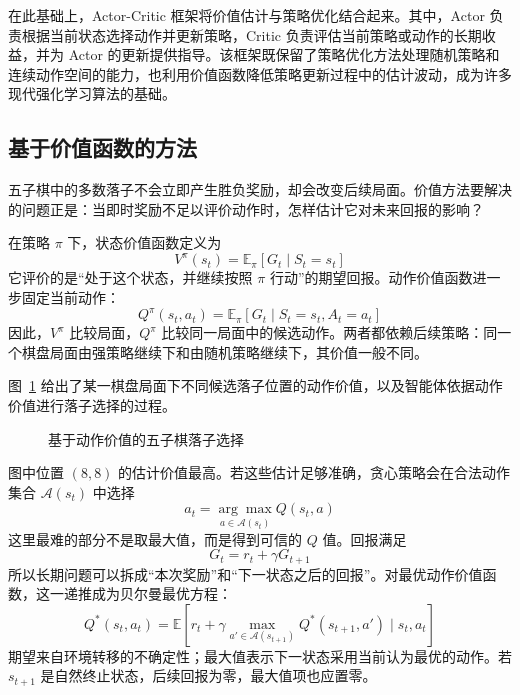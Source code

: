 \documentclass[UTF8,a4paper,zihao=-4,oneside,openany]{ctexbook}
\begin{document}
在此基础上，Actor-Critic 框架将价值估计与策略优化结合起来。其中，Actor 负责根据当前状态选择动作并更新策略，Critic 负责评估当前策略或动作的长期收益，并为 Actor 的更新提供指导。该框架既保留了策略优化方法处理随机策略和连续动作空间的能力，也利用价值函数降低策略更新过程中的估计波动，成为许多现代强化学习算法的基础。

\subsection{基于价值函数的方法}

五子棋中的多数落子不会立即产生胜负奖励，却会改变后续局面。价值方法要解决的问题正是：当即时奖励不足以评价动作时，怎样估计它对未来回报的影响？

在策略 $\pi$ 下，状态价值函数定义为
\begin{equation}
V^{\pi}(s_t)
=
\mathbb{E}_{\pi}\!\left[G_t\mid S_t=s_t\right]
\end{equation}
它评价的是“处于这个状态，并继续按照 $\pi$ 行动”的期望回报。动作价值函数进一步固定当前动作：
\begin{equation}
Q^{\pi}(s_t,a_t)
=
\mathbb{E}_{\pi}\!\left[G_t\mid S_t=s_t,A_t=a_t\right]
\end{equation}
因此，$V^\pi$ 比较局面，$Q^\pi$ 比较同一局面中的候选动作。两者都依赖后续策略：同一个棋盘局面由强策略继续下和由随机策略继续下，其价值一般不同。

图~\ref{fig:gobang_value} 给出了某一棋盘局面下不同候选落子位置的动作价值，以及智能体依据动作价值进行落子选择的过程。

\begin{figure}[htbp]
  \centering
  \caption{基于动作价值的五子棋落子选择}
  \label{fig:gobang_value}
\end{figure}

图中位置 $(8,8)$ 的估计价值最高。若这些估计足够准确，贪心策略会在合法动作集合 $\mathcal A(s_t)$ 中选择
\begin{equation}
a_t
=
\underset{a\in\mathcal{A}(s_t)}{\arg\max}
Q(s_t,a)
\end{equation}
这里最难的部分不是取最大值，而是得到可信的 $Q$ 值。回报满足
\begin{equation}
G_t=r_t+\gamma G_{t+1}
\end{equation}
所以长期问题可以拆成“本次奖励”和“下一状态之后的回报”。对最优动作价值函数，这一递推成为贝尔曼最优方程：
\begin{equation}
Q^{*}(s_t,a_t)
=
\mathbb{E}\!\left[
r_t+\gamma\max_{a'\in\mathcal{A}(s_{t+1})}
Q^{*}(s_{t+1},a')
\mid s_t,a_t\right]
\end{equation}
期望来自环境转移的不确定性；最大值表示下一状态采用当前认为最优的动作。若 $s_{t+1}$ 是自然终止状态，后续回报为零，最大值项也应置零。
\end{document}
